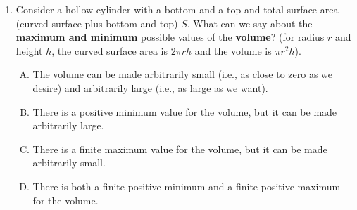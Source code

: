 \documentclass[10pt]{amsart}
\begin{document}
\begin{enumerate}
  \begin{enumerate}[(A)]
  \item The volume can be made arbitrarily small (i.e., as close to
    zero as we desire) and arbitrarily large (i.e., as large as we
    want).
  \item There is a positive minimum value for the volume, but it can
    be made arbitrarily large.
  \item There is a finite maximum value for the volume, but it can be
    made arbitrarily small.
  \item There is both a finite positive minimum and a finite positive
    maximum for the volume.
  \end{enumerate}

  {\em Answer}: Option (C)

  {\em Quick explanation}: We see that the radius cannot be expanded
  too much, otherwise the area of the bottom will itself exceed
  $S$. This puts a constraint on the total volume. On the other hand,
  the cylinder can be made arbitrarily thin and thus have arbitrarily
  small volume.

  {\em Full explanation}: Try it yourself! There is a worked example
  in the book that essentially computes the maximum with specific
  numerical values -- locate it!

  {\em Performance review}: $4$ out of $12$ got this correct. $3$ each
  chose (B) and (D), $2$ chose (A).

  {\em Historical note (last year)}: $8$ out of $15$ people got this
  correct. $1$ person chose (A), $4$ people chose (B), and $2$ people
  chose (D).
\item Consider a hollow cylinder with a bottom and a top and total
  surface area (curved surface plus bottom and top) $S$. What can we
  say about the {\bf maximum and minimum} possible values of the {\bf
  volume}?  (for radius $r$ and height $h$, the curved surface area is
  $2\pi rh$ and the volume is $\pi r^2h$).

  \begin{enumerate}[(A)]
  \item The volume can be made arbitrarily small (i.e., as close to
    zero as we desire) and arbitrarily large (i.e., as large as we
    want).
  \item There is a positive minimum value for the volume, but it can
    be made arbitrarily large.
  \item There is a finite maximum value for the volume, but it can be
    made arbitrarily small.
  \item There is both a finite positive minimum and a finite positive
    maximum for the volume.
  \end{enumerate}


\end{enumerate}
\end{document}
